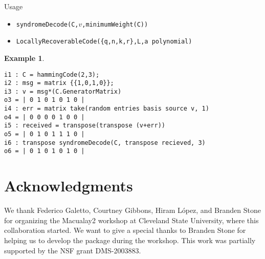\documentclass[12pt]{amsart}
\theoremstyle{plain}
\newtheorem{example}[theorem]{Example}
\begin{document}
\medskip

Usage

\medskip

\begin{itemize}
\item {\tt syndromeDecode(C,$v$,minimumWeight(C))}
\item {\tt LocallyRecoverableCode(\{q,n,k,r\},L,a polynomial)}
\end{itemize}

\medskip


\begin{example}
$\,$
\begin{verbatim}
i1 : C = hammingCode(2,3);
i2 : msg = matrix {{1,0,1,0}};
i3 : v = msg*(C.GeneratorMatrix)
o3 = | 0 1 0 1 0 1 0 |
i4 : err = matrix take(random entries basis source v, 1)
o4 = | 0 0 0 0 1 0 0 |
i5 : received = transpose(transpose (v+err))
o5 = | 0 1 0 1 1 1 0 |
i6 : transpose syndromeDecode(C, transpose recieved, 3)
o6 = | 0 1 0 1 0 1 0 |
\end{verbatim}
\end{example}







\section*{Acknowledgments}
We thank Federico Galetto, Courtney Gibbons, Hiram L\'opez, and Branden Stone for organizing the Macualay2 workshop at Cleveland State University, where this collaboration started. We want to give a special thanks to Branden Stone for helping us to develop the package during the workshop. This work was partially supported by the NSF grant DMS-2003883.
\end{document}
